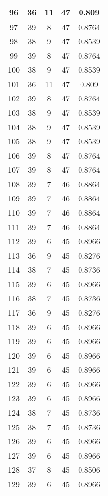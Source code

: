 \documentclass[letterpaper, 12pt]{article}
\begin{document}
\begin{longtable}{|c|c|c|c|c|}
\hline
96 & 36 & 11 & 47 & 0.809 \\
\hline
97 & 39 & 8 & 47 & 0.8764 \\
\hline
98 & 38 & 9 & 47 & 0.8539 \\
\hline
99 & 39 & 8 & 47 & 0.8764 \\
\hline
100 & 38 & 9 & 47 & 0.8539 \\
\hline
101 & 36 & 11 & 47 & 0.809 \\
\hline
102 & 39 & 8 & 47 & 0.8764 \\
\hline
103 & 38 & 9 & 47 & 0.8539 \\
\hline
104 & 38 & 9 & 47 & 0.8539 \\
\hline
105 & 38 & 9 & 47 & 0.8539 \\
\hline
106 & 39 & 8 & 47 & 0.8764 \\
\hline
107 & 39 & 8 & 47 & 0.8764 \\
\hline
108 & 39 & 7 & 46 & 0.8864 \\
\hline
109 & 39 & 7 & 46 & 0.8864 \\
\hline
110 & 39 & 7 & 46 & 0.8864 \\
\hline
111 & 39 & 7 & 46 & 0.8864 \\
\hline
112 & 39 & 6 & 45 & 0.8966 \\
\hline
113 & 36 & 9 & 45 & 0.8276 \\
\hline
114 & 38 & 7 & 45 & 0.8736 \\
\hline
115 & 39 & 6 & 45 & 0.8966 \\
\hline
116 & 38 & 7 & 45 & 0.8736 \\
\hline
117 & 36 & 9 & 45 & 0.8276 \\
\hline
118 & 39 & 6 & 45 & 0.8966 \\
\hline
119 & 39 & 6 & 45 & 0.8966 \\
\hline
120 & 39 & 6 & 45 & 0.8966 \\
\hline
121 & 39 & 6 & 45 & 0.8966 \\
\hline
122 & 39 & 6 & 45 & 0.8966 \\
\hline
123 & 39 & 6 & 45 & 0.8966 \\
\hline
124 & 38 & 7 & 45 & 0.8736 \\
\hline
125 & 38 & 7 & 45 & 0.8736 \\
\hline
126 & 39 & 6 & 45 & 0.8966 \\
\hline
127 & 39 & 6 & 45 & 0.8966 \\
\hline
128 & 37 & 8 & 45 & 0.8506 \\
\hline
129 & 39 & 6 & 45 & 0.8966 \\

\end{longtable}
\end{document}
